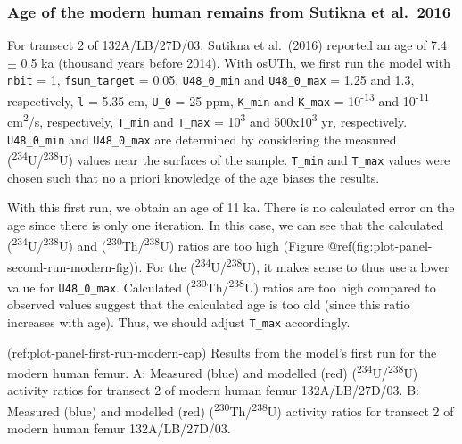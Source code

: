 \documentclass[]{elsarticle} %
\begin{document}
\hypertarget{age-of-the-modern-human-remains-from-sutikna-et-al.-2016}{%
\subsubsection{Age of the modern human remains from Sutikna et al.~2016}\label{age-of-the-modern-human-remains-from-sutikna-et-al.-2016}}

For transect 2 of 132A/LB/27D/03, Sutikna et al.~(2016) reported an age of 7.4 \(\pm\) 0.5 ka (thousand years before 2014). With osUTh, we first run the model with \texttt{nbit} = 1, \texttt{fsum\_target} = 0.05, \texttt{U48\_0\_min} and \texttt{U48\_0\_max} = 1.25 and 1.3, respectively, \texttt{l} = 5.35 cm, \texttt{U\_0} = 25 ppm, \texttt{K\_min} and \texttt{K\_max} = 10\textsuperscript{-13} and 10\textsuperscript{-11} cm\textsuperscript{2}/s, respectively, \texttt{T\_min} and \texttt{T\_max} = 10\textsuperscript{3} and 500x10\textsuperscript{3} yr, respectively. \texttt{U48\_0\_min} and \texttt{U48\_0\_max} are determined by considering the measured (\textsuperscript{234}U/\textsuperscript{238}U) values near the surfaces of the sample. \texttt{T\_min} and \texttt{T\_max} values were chosen such that no a priori knowledge of the age biases the results.

With this first run, we obtain an age of 11 ka. There is no calculated error on the age since there is only one iteration. In this case, we can see that the calculated (\textsuperscript{234}U/\textsuperscript{238}U) and (\textsuperscript{230}Th/\textsuperscript{238}U) ratios are too high (Figure @ref(fig:plot-panel-second-run-modern-fig)). For the (\textsuperscript{234}U/\textsuperscript{238}U), it makes sense to thus use a lower value for \texttt{U48\_0\_max}. Calculated (\textsuperscript{230}Th/\textsuperscript{238}U) ratios are too high compared to observed values suggest that the calculated age is too old (since this ratio increases with age). Thus, we should adjust \texttt{T\_max} accordingly.

(ref:plot-panel-first-run-modern-cap) Results from the model's first run for the modern human femur. A: Measured (blue) and modelled (red) (\textsuperscript{234}U/\textsuperscript{238}U) activity ratios for transect 2 of modern human femur 132A/LB/27D/03. B: Measured (blue) and modelled (red) (\textsuperscript{230}Th/\textsuperscript{238}U) activity ratios for transect 2 of modern human femur 132A/LB/27D/03.
\end{document}
